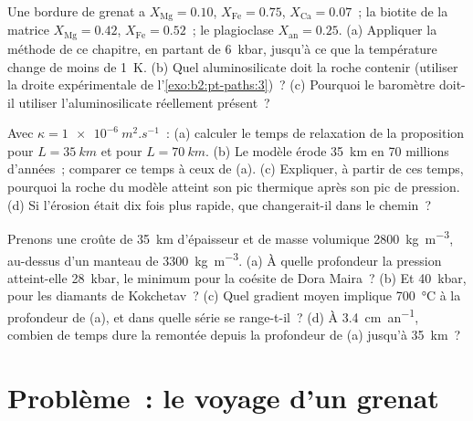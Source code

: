 \begin{exercise}[$\star\star\star$]\label{exo:b2:pt-paths:10}
Une bordure de grenat a $X_{\text{Mg}} = 0.10$, $X_{\text{Fe}} = 0.75$, $X_{\text{Ca}} = 0.07$~;
la biotite de la matrice $X_{\text{Mg}} = 0.42$, $X_{\text{Fe}} = 0.52$~; le plagioclase
$X_{\text{an}} = 0.25$. (a) Appliquer la méthode de ce chapitre, en partant de \qty{6}{kbar},
jusqu'à ce que la température change de moins de \qty{1}{K}. (b) Quel aluminosilicate doit
la roche contenir (utiliser la droite expérimentale de l'\cref{exo:b2:pt-paths:3})~? (c) Pourquoi le baromètre doit-il utiliser
l'aluminosilicate réellement présent~?
\end{exercise}

\begin{exercise}[$\star\star\star$]\label{exo:b2:pt-paths:11}
Avec $\kappa = \qty{1e-6}{m^2.s^{-1}}$~: (a) calculer le temps de relaxation de la
proposition pour $L = \qty{35}{km}$ et pour $L = \qty{70}{km}$. (b) Le modèle érode
\qty{35}{km} en 70 millions d'années~; comparer ce temps à ceux de (a). (c) Expliquer,
à partir de ces temps, pourquoi la roche du modèle atteint son pic thermique après son pic de
pression. (d) Si l'érosion était dix fois plus rapide, que changerait-il dans le chemin~?
\end{exercise}

\begin{exercise}[$\star\star\star$]\label{exo:b2:pt-paths:12}
Prenons une croûte de \qty{35}{km} d'épaisseur et de masse volumique \qty{2800}{kg.m^{-3}}, au-dessus d'un manteau de
\qty{3300}{kg.m^{-3}}. (a) À quelle profondeur la pression atteint-elle \qty{28}{kbar}, le
minimum pour la coésite de Dora Maira~? (b) Et \qty{40}{kbar}, pour les diamants de Kokchetav~?
(c) Quel gradient moyen implique \qty{700}{\celsius} à la profondeur de (a), et dans quelle
série se range-t-il~? (d) À \qty{3.4}{cm.an^{-1}}, combien de temps dure la remontée depuis la profondeur
de (a) jusqu'à \qty{35}{km}~?
\end{exercise}

\section{Problème~: le voyage d'un grenat}

